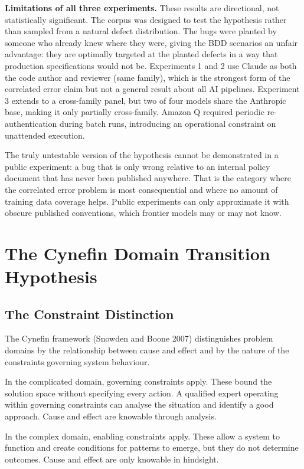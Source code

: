 \documentclass{article}
\begin{document}
\textbf{Limitations of all three experiments.} These results are directional,
not statistically significant. The corpus was designed to test the
hypothesis rather than sampled from a natural defect distribution. The bugs
were planted by someone who already knew where they were, giving the BDD
scenarios an unfair advantage: they are optimally targeted at the planted
defects in a way that production specifications would not be. Experiments 1
and 2 use Claude as both the code author and reviewer (same family), which
is the strongest form of the correlated error claim but not a general
result about all AI pipelines. Experiment 3 extends to a cross-family
panel, but two of four models share the Anthropic base, making it only
partially cross-family. Amazon Q required periodic re-authentication during
batch runs, introducing an operational constraint on unattended execution.

The truly untestable version of the hypothesis cannot be demonstrated in a
public experiment: a bug that is only wrong relative to an internal policy
document that has never been published anywhere. That is the category where
the correlated error problem is most consequential and where no amount of
training data coverage helps. Public experiments can only approximate it
with obscure published conventions, which frontier models may or may not
know.


\section{The Cynefin Domain Transition Hypothesis}

\subsection{The Constraint Distinction}

The Cynefin framework (Snowden and Boone 2007) distinguishes problem
domains by the relationship between cause and effect and by the nature of
the constraints governing system behaviour.

In the complicated domain, governing constraints apply. These bound the
solution space without specifying every action. A qualified expert
operating within governing constraints can analyse the situation and
identify a good approach. Cause and effect are knowable through analysis.

In the complex domain, enabling constraints apply. These allow a system
to function and create conditions for patterns to emerge, but they do not
determine outcomes. Cause and effect are only knowable in hindsight.
\end{document}

